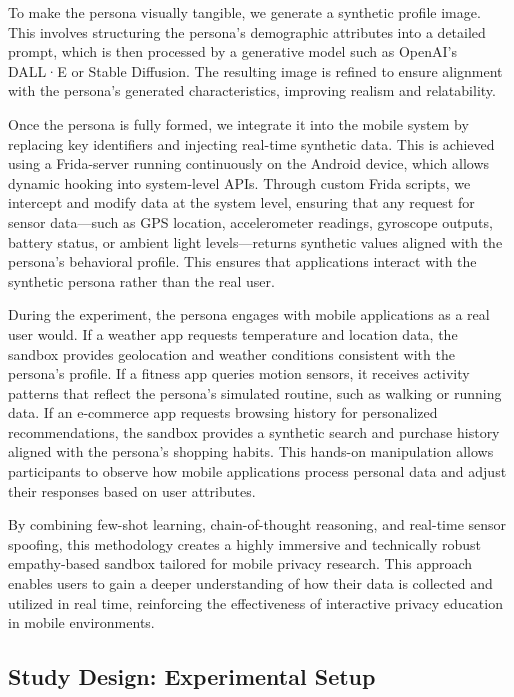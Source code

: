 \documentclass[acmlarge, nonacm]{acmart}
\begin{document}
To make the persona visually tangible, we generate a synthetic profile image. This involves structuring the persona’s demographic attributes into a detailed prompt, which is then processed by a generative model such as OpenAI’s DALL·E or Stable Diffusion. The resulting image is refined to ensure alignment with the persona’s generated characteristics, improving realism and relatability.

Once the persona is fully formed, we integrate it into the mobile system by replacing key identifiers and injecting real-time synthetic data. This is achieved using a Frida-server running continuously on the Android device, which allows dynamic hooking into system-level APIs. Through custom Frida scripts, we intercept and modify data at the system level, ensuring that any request for sensor data—such as GPS location, accelerometer readings, gyroscope outputs, battery status, or ambient light levels—returns synthetic values aligned with the persona's behavioral profile. This ensures that applications interact with the synthetic persona rather than the real user.

During the experiment, the persona engages with mobile applications as a real user would. If a weather app requests temperature and location data, the sandbox provides geolocation and weather conditions consistent with the persona’s profile. If a fitness app queries motion sensors, it receives activity patterns that reflect the persona’s simulated routine, such as walking or running data. If an e-commerce app requests browsing history for personalized recommendations, the sandbox provides a synthetic search and purchase history aligned with the persona’s shopping habits. This hands-on manipulation allows participants to observe how mobile applications process personal data and adjust their responses based on user attributes.

By combining few-shot learning, chain-of-thought reasoning, and real-time sensor spoofing, this methodology creates a highly immersive and technically robust empathy-based sandbox tailored for mobile privacy research. This approach enables users to gain a deeper understanding of how their data is collected and utilized in real time, reinforcing the effectiveness of interactive privacy education in mobile environments.


\subsection{Study Design: Experimental Setup}
\end{document}
